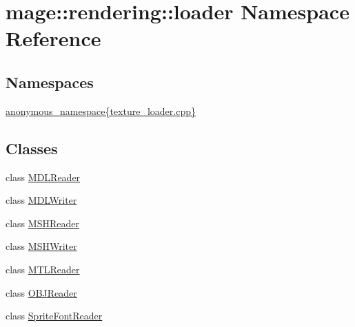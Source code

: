 \hypertarget{namespacemage_1_1rendering_1_1loader}{}\section{mage\+:\+:rendering\+:\+:loader Namespace Reference}
\label{namespacemage_1_1rendering_1_1loader}
\subsection*{Namespaces}
\begin{DoxyCompactItemize}
\item 
 \mbox{\hyperlink{namespacemage_1_1rendering_1_1loader_1_1anonymous__namespace_02texture__loader_8cpp_03}{anonymous\+\_\+namespace\{texture\+\_\+loader.\+cpp\}}}
\end{DoxyCompactItemize}
\subsection*{Classes}
\begin{DoxyCompactItemize}
\item 
class \mbox{\hyperlink{classmage_1_1rendering_1_1loader_1_1_m_d_l_reader}{M\+D\+L\+Reader}}
\item 
class \mbox{\hyperlink{classmage_1_1rendering_1_1loader_1_1_m_d_l_writer}{M\+D\+L\+Writer}}
\item 
class \mbox{\hyperlink{classmage_1_1rendering_1_1loader_1_1_m_s_h_reader}{M\+S\+H\+Reader}}
\item 
class \mbox{\hyperlink{classmage_1_1rendering_1_1loader_1_1_m_s_h_writer}{M\+S\+H\+Writer}}
\item 
class \mbox{\hyperlink{classmage_1_1rendering_1_1loader_1_1_m_t_l_reader}{M\+T\+L\+Reader}}
\item 
class \mbox{\hyperlink{classmage_1_1rendering_1_1loader_1_1_o_b_j_reader}{O\+B\+J\+Reader}}
\item 
class \mbox{\hyperlink{classmage_1_1rendering_1_1loader_1_1_sprite_font_reader}{Sprite\+Font\+Reader}}
\end{DoxyCompactItemize}
